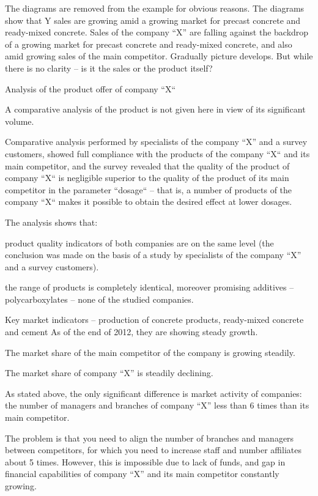 \documentclass[11pt,a4paper]{book}
\begin{document}
The diagrams are removed from the example for obvious reasons. The diagrams
show that Y sales are growing amid a growing market for precast concrete and
ready-mixed concrete.  Sales of the company “X” are falling against the
backdrop of a growing market for precast concrete and ready-mixed concrete,
and also amid growing sales of the main competitor. Gradually picture
develops. But while there is no clarity -- is it the sales or the product
itself?

Analysis of the product offer of company “X“

A comparative analysis of the product is not given here in view of its
significant volume.

Comparative analysis performed by specialists of the company “X” and a survey
customers, showed full compliance with the products of the company “X“ and its
main competitor, and the survey revealed that the quality of the product of
company “X“ is negligible superior to the quality of the product of its main
competitor in the parameter “dosage“ -- that is, a number of products of the
company “X“ makes it possible to obtain the desired effect at lower dosages.

The analysis shows that:

product quality indicators of both companies are on the same level (the
conclusion was made on the basis of a study by specialists of the company “X”
and a survey customers).

the range of products is completely identical, moreover promising additives --
polycarboxylates -- none of the studied companies.

Key market indicators -- production of concrete products, ready-mixed concrete
and cement As of the end of 2012, they are showing steady growth.

The market share of the main competitor of the company is growing steadily.

The market share of company “X” is steadily declining.

As stated above, the only significant difference is market activity of
companies: the number of managers and branches of company “X” less than 6
times than its main competitor.

The problem is that you need to align the number of branches and managers
between competitors, for which you need to increase staff and number
affiliates about 5 times. However, this is impossible due to lack of funds,
and gap in financial capabilities of company “X” and its main competitor
constantly growing.
\end{document}
